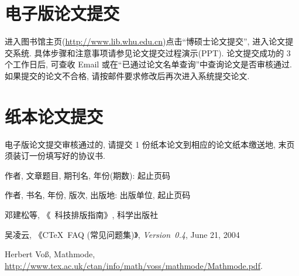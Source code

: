 \documentclass{WHUMaster}   %
\begin{document}
\section*{电子版论文提交}

		进入图书馆主页(\url{http://www.lib.whu.edu.cn})点击``博硕士论文提交'', 进入论文提交系统.
		具体步骤和注意事项请参见论文提交过程演示(PPT).
		论文提交成功的 3 个工作日后, 可查收 Email 或在``已通过论文名单查询''中查询论文是否审核通过.
		如果提交的论文不合格, 请按邮件要求修改后再次进入系统提交论文.


\section*{纸本论文提交}

		电子版论文提交审核通过的, 请提交 1 份纸本论文到相应的论文纸本缴送地,
		末页须装订一份填写好的协议书.





\cleardoublepage{}
{}
\begin{thebibliography}{000}

	 作者, 文章题目, 期刊名, 年份(期数): 起止页码

	 作者, 书名, 年份, 版次, 出版地: 出版单位, 起止页码

	 邓建松等, 《\LaTeXe~科技排版指南》, 科学出版社

	 吴凌云, 《CTeX~FAQ (常见问题集)》, \textit{Version~0.4}, June 21, 2004

	 Herbert Vo\ss, Mathmode, \url{http://www.tex.ac.uk/ctan/info/math/voss/mathmode/Mathmode.pdf}.

\end{thebibliography}



\backmatter
\cleardoublepage
\end{document}
